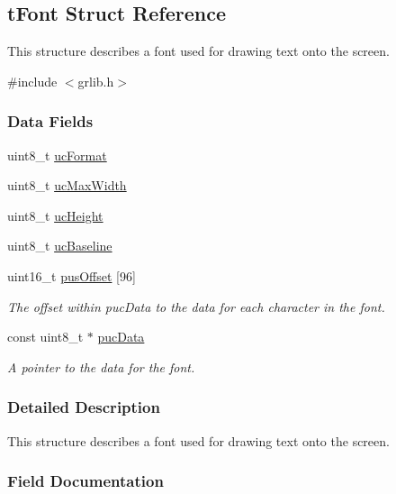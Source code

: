 \subsection{t\+Font Struct Reference}
\label{structt_font}


This structure describes a font used for drawing text onto the screen.  




{\ttfamily \#include $<$grlib.\+h$>$}

\subsubsection*{Data Fields}
\begin{DoxyCompactItemize}
\item 
uint8\+\_\+t \hyperlink{structt_font_ab3d9bf0e614df9f6cc7661e81ddb13bd}{uc\+Format}
\item 
uint8\+\_\+t \hyperlink{structt_font_adc3224837f7d59be6fdefe7fd897c8d2}{uc\+Max\+Width}
\item 
uint8\+\_\+t \hyperlink{structt_font_a50434353412200d8aff88751c9297a37}{uc\+Height}
\item 
uint8\+\_\+t \hyperlink{structt_font_a0602c7d3f8ffe42a5267d4d4ad004690}{uc\+Baseline}
\item 
uint16\+\_\+t \hyperlink{structt_font_ad6e46d3ebb0f14342270c9b68a78b39f}{pus\+Offset} \mbox{[}96\mbox{]}
\begin{DoxyCompactList}\small\item\em The offset within puc\+Data to the data for each character in the font. \end{DoxyCompactList}\item 
const uint8\+\_\+t $\ast$ \hyperlink{structt_font_a75e07a7c5ae975bc77534b2eebfb2b67}{puc\+Data}
\begin{DoxyCompactList}\small\item\em A pointer to the data for the font. \end{DoxyCompactList}\end{DoxyCompactItemize}


\subsubsection{Detailed Description}
This structure describes a font used for drawing text onto the screen. 

\subsubsection{Field Documentation}
